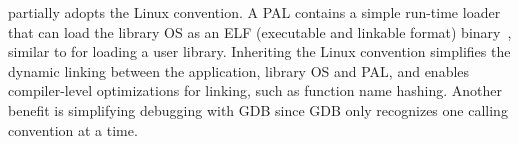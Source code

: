 \Thehostabi{} partially adopts the \graphenearch{} Linux convention. %
A PAL contains a simple run-time loader that can load the library OS as an ELF (executable and linkable format) binary~\cite{elf-format}, similar to  for loading a user library.
Inheriting the Linux convention
simplifies the dynamic linking between the application, library OS and PAL,
and enables compiler-level optimizations for linking,
such as function name hashing.
Another benefit is simplifying debugging with GDB since GDB only recognizes one calling convention at a time.









